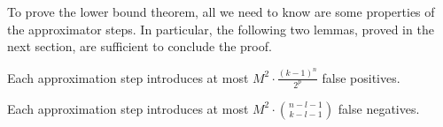 To prove the lower bound theorem, all we need to know are some properties of the approximator steps. In particular, the following two lemmas, proved in the next section, are sufficient to conclude the proof.   







\begin{lemma}\label{lem:new-false-positives}
Each approximation step introduces at most $M^2 \cdot \frac{(k-1)^n}{2^p}$ false positives.
\end{lemma}

\begin{lemma}\label{lem:new-false-negatives}
Each approximation step introduces at most $M^2 \cdot\binom{n-l-1}{k-l-1}$ false negatives.
\end{lemma}


\bigskip









